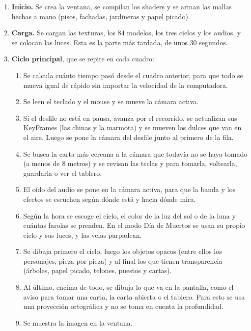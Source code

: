 \documentclass[11pt,a4paper]{article}
\begin{document}
\begin{enumerate}
  \item \textbf{Inicio.} Se crea la ventana, se compilan los shaders y se arman las mallas hechas a mano (pisos, fachadas, jardineras y papel picado).
  \item \textbf{Carga.} Se cargan las texturas, los 84 modelos, los tres cielos y los audios, y se colocan las luces. Esta es la parte más tardada, de unos 30 segundos.
  \item \textbf{Ciclo principal}, que se repite en cada cuadro:
  \begin{enumerate}
    \item Se calcula cuánto tiempo pasó desde el cuadro anterior, para que todo se mueva igual de rápido sin importar la velocidad de la computadora.
    \item Se leen el teclado y el mouse y se mueve la cámara activa.
    \item Si el desfile no está en pausa, avanza por el recorrido, se actualizan sus KeyFrames (las chinas y la marmota) y se mueven los dulces que van en el aire. Luego se pone la cámara del desfile junto al primero de la fila.
    \item Se busca la carta más cercana a la cámara que todavía no se haya tomado (a menos de 8 metros) y se revisan las teclas  y  para tomarla, voltearla, guardarla o ver el tablero.
    \item El oído del audio se pone en la cámara activa, para que la banda y los efectos se escuchen según dónde está y hacia dónde mira.
    \item Según la hora se escoge el cielo, el color de la luz del sol o de la luna y cuántas farolas se prenden. En el modo Día de Muertos se usan su propio cielo y sus luces, y las velas parpadean.
    \item Se dibuja primero el cielo, luego los objetos opacos (entre ellos los personajes, pieza por pieza) y al final los que tienen transparencia (árboles, papel picado, telones, puestos y cartas).
    \item Al último, encima de todo, se dibuja lo que va en la pantalla, como el aviso para tomar una carta, la carta abierta o el tablero. Para esto se usa una proyección ortográfica y no se toma en cuenta la profundidad.
    \item Se muestra la imagen en la ventana.
  \end{enumerate}
\end{enumerate}

\end{document}
